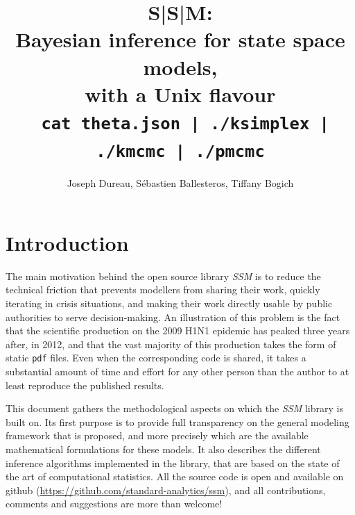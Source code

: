 \documentclass[a4paper,11pt,titlepage]{article}
\theoremstyle{plain} %
\begin{document}
\vspace{2 cm} 
\title{S|S|M:\\ Bayesian inference for state space models,\\ with a Unix flavour\\ \vspace{1 cm} {\large \texttt{ cat theta.json | ./ksimplex | ./kmcmc | ./pmcmc}}}


\author{Joseph Dureau, S\'ebastien Ballesteros, Tiffany Bogich}

\maketitle


\section{Introduction}

The main motivation behind the open source library \emph{SSM} is to reduce the technical friction that prevents modellers from sharing their work, quickly iterating in crisis situations, and making their work directly usable by public authorities to serve decision-making.
An illustration of this problem is the fact that the scientific production on the 2009 H1N1 epidemic has peaked three years after, in  2012, and that the vast majority of this production takes the form of static  \texttt{pdf} files. Even when the corresponding code is shared, it takes a substantial amount of time and effort for any other person than the author to at least reproduce the published results. 

This document gathers the methodological aspects on which the \emph{SSM} library is built on. Its first purpose is to provide full transparency on the general modeling framework that is proposed, and more precisely which are the available mathematical formulations for these models. It also describes the different inference algorithms implemented in the library, that are based on the state of the art of computational statistics.  All the source code is open and available on github (\href{https://github.com/standard-analytics/ssm}{https://github.com/standard-analytics/ssm}), and all contributions, comments and suggestions are more than welcome!
\end{document}
